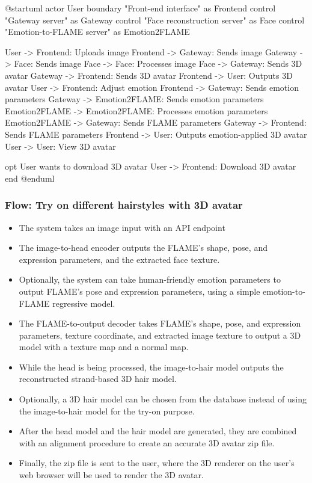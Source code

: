 \begin{umlfigure}
    @startuml
    actor User
    boundary "Front-end interface" as Frontend
    control "Gateway server" as Gateway
    control "Face reconstruction server" as Face
    control "Emotion-to-FLAME server" as Emotion2FLAME

    User -> Frontend: Uploads image
    Frontend -> Gateway: Sends image
    Gateway -> Face: Sends image
    Face -> Face: Processes image
    Face -> Gateway: Sends 3D avatar
    Gateway -> Frontend: Sends 3D avatar
    Frontend -> User: Outputs 3D avatar
    User -> Frontend: Adjust emotion
    Frontend -> Gateway: Sends emotion parameters
    Gateway -> Emotion2FLAME: Sends emotion parameters
    Emotion2FLAME -> Emotion2FLAME: Processes emotion parameters
    Emotion2FLAME -> Gateway: Sends FLAME parameters
    Gateway -> Frontend: Sends FLAME parameters
    Frontend -> User: Outputs emotion-applied 3D avatar
    User -> User: View 3D avatar
    
    opt User wants to download 3D avatar
    User -> Frontend: Download 3D avatar
    end
    @enduml
\end{umlfigure}



\subsubsection{Flow: Try on different hairstyles with 3D avatar}




\begin{itemize}
    \item The system takes an image input with an API endpoint
    \item The image-to-head encoder outputs the FLAME's shape, pose, and expression parameters, and the extracted face texture.
    \item Optionally, the system can take human-friendly emotion parameters to output FLAME's pose and expression parameters, using a simple emotion-to-FLAME regressive model.
    \item The FLAME-to-output decoder takes FLAME's shape, pose, and expression parameters, texture coordinate, and extracted image texture to output a 3D model with a texture map and a normal map.
    \item While the head is being processed, the image-to-hair model outputs the reconstructed strand-based 3D hair model.
    \item Optionally, a 3D hair model can be chosen from the database instead of using the image-to-hair model for the try-on purpose.
    \item After the head model and the hair model are generated, they are combined with an alignment procedure to create an accurate 3D avatar zip file.
    \item Finally, the zip file is sent to the user, where the 3D renderer on the user's web browser will be used to render the 3D avatar.
\end{itemize}


